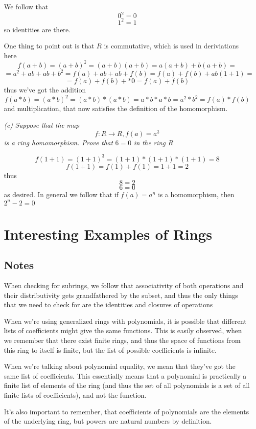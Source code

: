 \documentclass[11pt,oneside,titlepage]{book}
\begin{document}
We follow that
$$0^2 = 0$$
$$1^2 = 1$$
so identities are there.

One thing to point out is that $R$ is commutative, which is used in
deriviations here
$$f(a + b) = (a + b)^2 = (a + b)(a + b) = a(a + b) + b(a + b) = $$
$$ = a^2 + ab + ab + b^2 = f(a) + ab + ab + f(b) = f(a) + f(b) + ab(1 + 1) = $$
$$ = f(a) + f(b) +  * 0 = f(a) + f(b)$$
thus we've got the addition
$$f(a * b) = (a * b)^2 = (a * b) * (a * b) = a * b * a * b = a^2 * b^2 = f(a) * f(b)$$
and multiplication, that now satisfies the definition of the
homomorphism.

\textit{(c) Suppose that the map
  $$f: R \to R, f(a) = a^3$$
  is a ring homomorphism. Prove that $6 = 0$ in the ring $R$}

$$ f(1 + 1) = (1 + 1)^3 = (1 + 1) * (1 + 1) * (1 + 1) = 8$$
$$ f(1 + 1) = f(1) + f(1) = 1 + 1 = 2$$
thus
$$8 = 2$$
$$6 = 0$$
as desired. In general we follow that if $f(a) = a^n$ is a
homomorphism, then $2^n - 2 = 0$

\section{Interesting Examples of Rings}

\subsection*{Notes}

When checking for subrings, we follow that associativity of both operations
and their distributivity gets grandfathered by the subset, and thus
the only things that we need to check for are the identities and closures
of operations 

When we're using generalized rings with polynomials, it is possible
that different lists of coefficients might give the same functions.
This is easily observed, when we remember that there exist finite
rings, and thus the space of functions from this ring to itself is
finite, but the list of possible coefficients is infinite.

When we're talking about polynomial equality, we mean that they've got
the same list of coefficients. This essentially means that a
polynomial is practically a finite list of elements of the ring (and
thus the set of all polynomials is a set of all finite lists of
coefficients), and not the function.

It's also important to remember, that coefficients of polynomials are
the elements of the underlying ring, but powers are natural
numbers by definition.
\end{document}
